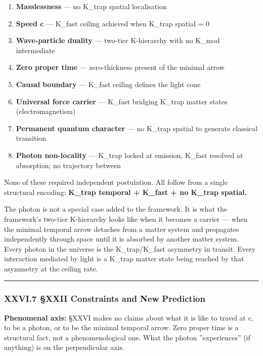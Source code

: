 \documentclass[12pt,a4paper]{article}
\begin{document}
\begin{enumerate}
    \item \textbf{Masslessness} --- no K\_trap spatial localisation
    \item \textbf{Speed c} --- K\_fast ceiling achieved when K\_trap spatial = 0
    \item \textbf{Wave-particle duality} --- two-tier K-hierarchy with no K\_mod intermediate
    \item \textbf{Zero proper time} --- zero-thickness present of the minimal arrow
    \item \textbf{Causal boundary} --- K\_fast ceiling defines the light cone
    \item \textbf{Universal force carrier} --- K\_fast bridging K\_trap matter states (electromagnetism)
    \item \textbf{Permanent quantum character} --- no K\_trap spatial to generate classical transition
    \item \textbf{Photon non-locality} --- K\_trap locked at emission, K\_fast resolved at absorption; no trajectory between
\end{enumerate}

None of these required independent postulation. All follow from a single structural encoding: \textbf{K\_trap temporal + K\_fast + no K\_trap spatial.}

The photon is not a special case added to the framework. It is what the framework's two-tier K-hierarchy looks like when it becomes a carrier --- when the minimal temporal arrow detaches from a matter system and propagates independently through space until it is absorbed by another matter system. Every photon in the universe is the K\_trap/K\_fast asymmetry in transit. Every interaction mediated by light is a K\_trap matter state being reached by that asymmetry at the ceiling rate.

\begin{center}
\rule{0.5\textwidth}{0.4pt}
\end{center}

\subsubsection{XXVI.7 §XXII Constraints and New Prediction}

\textbf{Phenomenal axis:} §XXVI makes no claims about what it is like to travel at c, to be a photon, or to be the minimal temporal arrow. Zero proper time is a structural fact, not a phenomenological one. What the photon ''experiences'' (if anything) is on the perpendicular axis.
\end{document}
